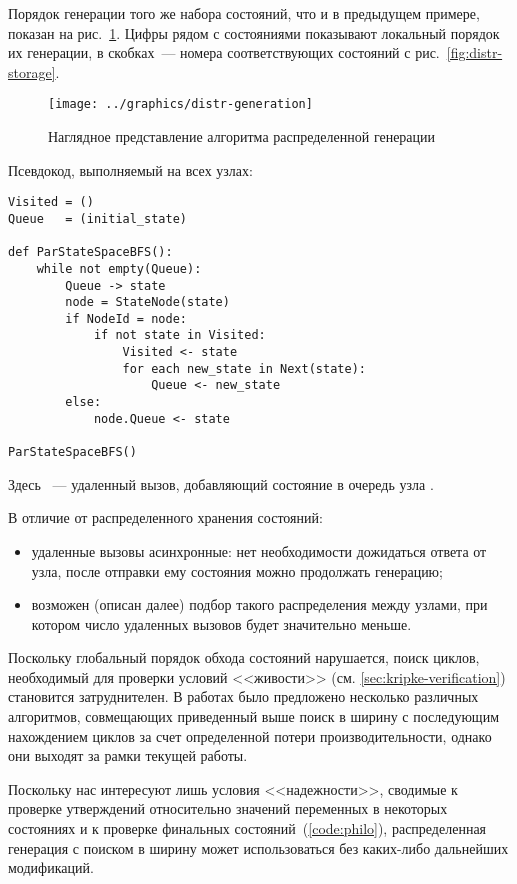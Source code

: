 Порядок генерации того же набора состояний, что и в предыдущем примере, показан на
рис.~\ref{fig:distr-generation}. Цифры рядом с состояниями показывают локальный порядок их
генерации, в скобках~--- номера соответствующих состояний с рис.~\ref{fig:distr-storage}.

\begin{figure}[!htb]
  \centering
  \texttt{[image: ../graphics/distr-generation]}
  \caption{Наглядное представление алгоритма распределенной генерации}
  \label{fig:distr-generation}
\end{figure}

Псевдокод, выполняемый на всех узлах:

\begin{lstlisting}[style=pseudocode]
Visited = ()
Queue   = (initial_state)

def ParStateSpaceBFS():
    while not empty(Queue):
        Queue -> state
        node = StateNode(state)
        if NodeId = node:
            if not state in Visited:
                Visited <- state
                for each new_state in Next(state):
                    Queue <- new_state
        else:
            node.Queue <- state

ParStateSpaceBFS()
\end{lstlisting}

Здесь ~--- удаленный вызов, добавляющий состояние в очередь узла
.

В отличие от распределенного хранения состояний:
\begin{itemize}
\item удаленные вызовы асинхронные: нет необходимости дожидаться ответа от узла, после
  отправки ему состояния можно продолжать генерацию;
\item возможен (описан далее) подбор такого распределения  между узлами,
  при котором число удаленных вызовов будет значительно меньше.~\cite{LS99}
\end{itemize}

Поскольку глобальный порядок обхода состояний нарушается, поиск циклов, необходимый для
проверки условий <<живости>> (см. \ref{sec:kripke-verification}) становится
затруднителен. В работах \cite{DLTL1,DLTL2} было предложено несколько различных
алгоритмов, совмещающих приведенный выше поиск в ширину с последующим нахождением циклов
за счет определенной потери производительности, однако они выходят за рамки текущей работы.

Поскольку нас интересуют лишь условия <<надежности>>, сводимые к проверке утверждений
относительно значений переменных в некоторых состояниях и к проверке финальных
состояний~(\ref{code:philo}), распределенная генерация с поиском в ширину может
использоваться без каких-либо дальнейших модификаций.

